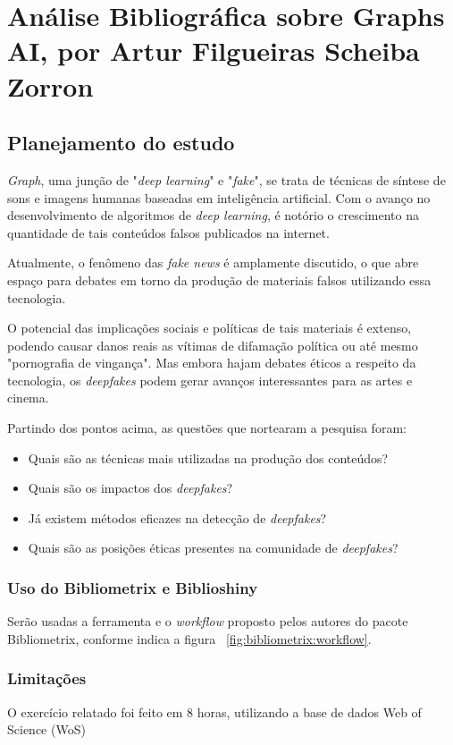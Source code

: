 \chapter{Análise Bibliográfica sobre Graphs AI, por Artur Filgueiras Scheiba Zorron\label{chap:bibliometria:titofrota}}

\section{Planejamento do estudo}

\textit{Graph}, uma junção de "\textit{deep learning}" e "\textit{fake}", se trata de técnicas de síntese de sons e imagens humanas baseadas em inteligência artificial. Com o avanço no desenvolvimento de algoritmos de \textit{deep learning}, é notório o crescimento na quantidade de tais conteúdos falsos publicados na internet.

Atualmente, o fenômeno das \textit{fake news} é amplamente discutido, o que abre espaço para debates em torno da produção de materiais falsos utilizando essa tecnologia.

O potencial das implicações sociais e políticas de tais materiais é extenso, podendo causar danos reais as vítimas de difamação política ou até mesmo "pornografia de vingança". Mas embora hajam debates éticos a respeito da tecnologia, os \textit{deepfakes} podem gerar avanços interessantes para as artes e cinema. 

Partindo dos pontos acima, as questões que nortearam a pesquisa foram:
\begin{itemize}
    \item Quais são as técnicas mais utilizadas na produção dos conteúdos?
    \item Quais são os impactos dos \textit{deepfakes}?
    \item Já existem métodos eficazes na detecção de \textit{deepfakes}? 
    \item Quais são as posições éticas presentes na comunidade de \textit{deepfakes}?
\end{itemize}

\subsection{Uso do Bibliometrix e Biblioshiny}
Serão usadas a ferramenta e o \textit{workflow} proposto pelos autores do pacote Bibliometrix, conforme indica a figura ~\ref{fig:bibliometrix:workflow}.

\subsection{Limitações} O exercício relatado foi feito em 8 horas, utilizando a base de dados Web of Science (WoS)


